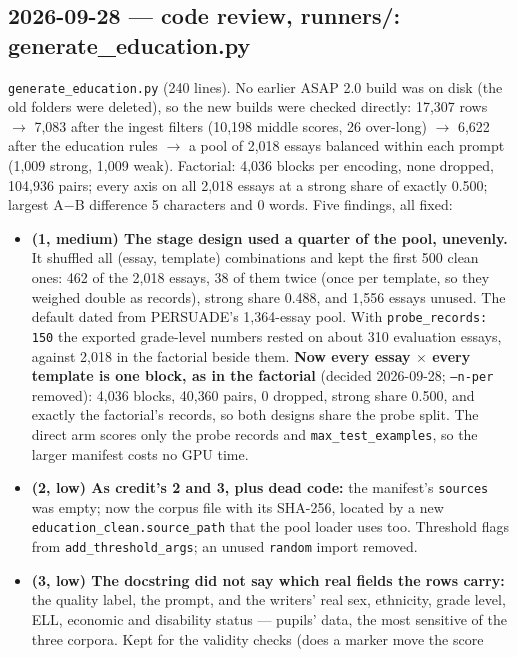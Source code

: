 \documentclass{article}
\begin{document}
\subsection*{2026-09-28 --- code review, runners/: generate\_education.py}
\texttt{generate\_education.py} (240 lines). No earlier ASAP 2.0 build was on disk (the old folders were deleted),
so the new builds were checked directly: 17{,}307 rows $\to$ 7{,}083 after the ingest filters (10{,}198 middle
scores, 26 over-long) $\to$ 6{,}622 after the education rules $\to$ a pool of 2{,}018 essays balanced within each
prompt (1{,}009 strong, 1{,}009 weak). Factorial: 4{,}036 blocks per encoding, none dropped, 104{,}936 pairs;
every axis on all 2{,}018 essays at a strong share of exactly 0.500; largest A$-$B difference 5 characters and 0
words. Five findings, all fixed:
\begin{itemize}
  \item \textbf{(1, medium) The stage design used a quarter of the pool, unevenly.} It shuffled all (essay,
        template) combinations and kept the first 500 clean ones: 462 of the 2{,}018 essays, 38 of them twice
        (once per template, so they weighed double as records), strong share 0.488, and 1{,}556 essays unused. The
        default dated from PERSUADE's 1{,}364-essay pool. With \texttt{probe\_records: 150} the exported
        grade-level numbers rested on about 310 evaluation essays, against 2{,}018 in the factorial beside them.
        \textbf{Now every essay $\times$ every template is one block, as in the factorial} (decided 2026-09-28;
        \texttt{--n-per} removed): 4{,}036 blocks, 40{,}360 pairs, 0 dropped, strong share 0.500, and exactly the
        factorial's records, so both designs share the probe split. The direct arm scores only the probe records
        and \texttt{max\_test\_examples}, so the larger manifest costs no GPU time.
  \item \textbf{(2, low) As credit's 2 and 3, plus dead code:} the manifest's \texttt{sources} was empty; now the
        corpus file with its SHA-256, located by a new \texttt{education\_clean.source\_path} that the pool loader
        uses too. Threshold flags from \texttt{add\_threshold\_args}; an unused \texttt{random} import removed.
  \item \textbf{(3, low) The docstring did not say which real fields the rows carry:} the quality label, the prompt,
        and the writers' real sex, ethnicity, grade level, ELL, economic and disability status --- pupils' data,
        the most sensitive of the three corpora. Kept for the validity checks (does a marker move the score

\end{itemize}
\end{document}
